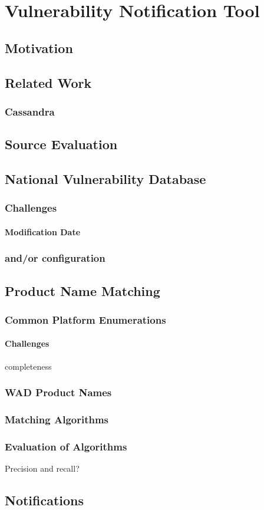 \chapter{Vulnerability Notification Tool}
\label{chap5-vulnerability-notification-tool}
\thispagestyle{empty}

\section{Motivation}

\section{Related Work}
\subsection{Cassandra}

\section{Source Evaluation}

\section{National Vulnerability Database}
\subsection{Challenges}
\subsubsection{Modification Date}
\subsection{and/or configuration}

\section{Product Name Matching}
\subsection{Common Platform Enumerations}
\subsubsection{Challenges}
completeness
\subsection{WAD Product Names}
\subsection{Matching Algorithms}
\subsection{Evaluation of Algorithms}
Precision and recall?
\section{Notifications}




